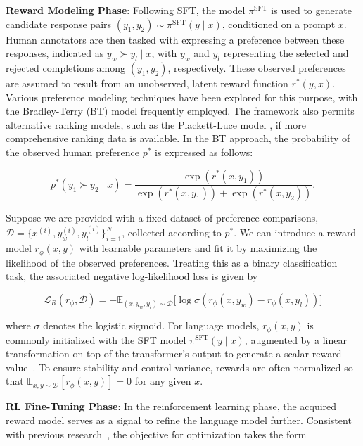 \textbf{Reward Modeling Phase}: Following SFT, the model $\pi^\text{SFT}$ is used to generate candidate response pairs $(y_1, y_2) \sim \pi^\text{SFT}(y \mid x)$, conditioned on a prompt $x$. Human annotators are then tasked with expressing a preference between these responses, indicated as $y_w\succ y_l \mid x$, with $y_w$ and $y_l$ representing the selected and rejected completions among $(y_1, y_2)$, respectively. These observed preferences are assumed to result from an unobserved, latent reward function $r^*(y, x)$. Various preference modeling techniques have been explored for this purpose, with the Bradley-Terry (BT) \cite{bradley1952rankanalysis} model frequently employed. The framework also permits alternative ranking models, such as the Plackett-Luce model \citep{plackett1975analysis, luce2012individual}, if more comprehensive ranking data is available. In the BT approach, the probability of the observed human preference $p^*$ is expressed as follows:

\begin{equation}\label{eq:bradley-terry}
    p^*(y_1\succ y_2 \mid x)=\frac{\exp\left(r^*(x, y_1)\right)}{\exp\left(r^*(x, y_1)\right) + \exp\left(r^*(x, y_2)\right)}.
\end{equation}

Suppose we are provided with a fixed dataset of preference comparisons, $\mathcal{D}=\bigl\{x^{(i)}, y_w^{(i)}, y_l^{(i)}\bigr\}_{i=1}^N$, collected according to $p^*$. We can introduce a reward model $r_{\phi}(x, y)$ with learnable parameters and fit it by maximizing the likelihood of the observed preferences. Treating this as a binary classification task, the associated negative log-likelihood loss is given by

\begin{equation}\label{eq:reward_model}
    \mathcal{L}_R(r_{\phi}, \mathcal{D}) = -\mathbb{E}_{(x, y_w, y_l)\sim \mathcal{D}}\bigl[\log \sigma(r_{\phi}(x, y_w)- r_{\phi}(x, y_l))\bigr]
\end{equation}

where $\sigma$ denotes the logistic sigmoid. For language models, $r_{\phi}(x, y)$ is commonly initialized with the SFT model $\pi^\text{SFT}(y \mid x)$, augmented by a linear transformation on top of the transformer's output to generate a scalar reward value~\cite{ziegler2020finetuning}. To ensure stability and control variance, rewards are often normalized so that $\mathbb{E}_{x,y\sim \mathcal{D}}\left[r_\phi(x, y)\right] = 0$ for any given $x$.

\textbf{RL Fine-Tuning Phase}: In the reinforcement learning phase, the acquired reward model serves as a signal to refine the language model further. Consistent with previous research~\citep{jaques2017sequence, jaques2020human}, the objective for optimization takes the form

